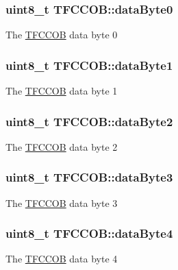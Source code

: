 \subsubsection[{data\+Byte0}]{\setlength{\rightskip}{0pt plus 5cm}uint8\+\_\+t T\+F\+C\+C\+O\+B\+::data\+Byte0}\label{struct_t_f_c_c_o_b_afe1ffc27722f769ccde0d10eca6d3c64}
The \hyperlink{struct_t_f_c_c_o_b}{T\+F\+C\+C\+O\+B} data byte 0 \hypertarget{struct_t_f_c_c_o_b_a0c700ddeb7af7a1fdf4613f23033e4d3}{}
\subsubsection[{data\+Byte1}]{\setlength{\rightskip}{0pt plus 5cm}uint8\+\_\+t T\+F\+C\+C\+O\+B\+::data\+Byte1}\label{struct_t_f_c_c_o_b_a0c700ddeb7af7a1fdf4613f23033e4d3}
The \hyperlink{struct_t_f_c_c_o_b}{T\+F\+C\+C\+O\+B} data byte 1 \hypertarget{struct_t_f_c_c_o_b_ab171d87e8477a175bc5fe774c17d1445}{}
\subsubsection[{data\+Byte2}]{\setlength{\rightskip}{0pt plus 5cm}uint8\+\_\+t T\+F\+C\+C\+O\+B\+::data\+Byte2}\label{struct_t_f_c_c_o_b_ab171d87e8477a175bc5fe774c17d1445}
The \hyperlink{struct_t_f_c_c_o_b}{T\+F\+C\+C\+O\+B} data byte 2 \hypertarget{struct_t_f_c_c_o_b_a8b09cfe8e42978d30fa6792fd59bda3b}{}
\subsubsection[{data\+Byte3}]{\setlength{\rightskip}{0pt plus 5cm}uint8\+\_\+t T\+F\+C\+C\+O\+B\+::data\+Byte3}\label{struct_t_f_c_c_o_b_a8b09cfe8e42978d30fa6792fd59bda3b}
The \hyperlink{struct_t_f_c_c_o_b}{T\+F\+C\+C\+O\+B} data byte 3 \hypertarget{struct_t_f_c_c_o_b_a4bf5c1a84500abd0f4e78092b2ddb9a4}{}
\subsubsection[{data\+Byte4}]{\setlength{\rightskip}{0pt plus 5cm}uint8\+\_\+t T\+F\+C\+C\+O\+B\+::data\+Byte4}\label{struct_t_f_c_c_o_b_a4bf5c1a84500abd0f4e78092b2ddb9a4}
The \hyperlink{struct_t_f_c_c_o_b}{T\+F\+C\+C\+O\+B} data byte 4 \hypertarget{struct_t_f_c_c_o_b_a8947206860f9581c055a4bddacac960f}{}

